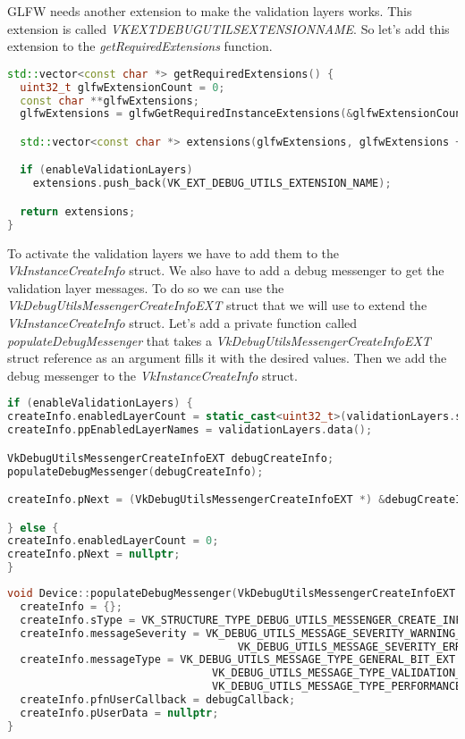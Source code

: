 \documentclass[12pt]{report} \usepackage{preamble}
\begin{document}
GLFW needs another extension to make the validation layers works. This extension is called
\textit{VK\textunderscore EXT\textunderscore DEBUG\textunderscore UTILS\textunderscore EXTENSION\textunderscore NAME}.
So let's add this extension to the \textit{getRequiredExtensions} function.

\begin{lstlisting}[language=C++]
std::vector<const char *> getRequiredExtensions() {
  uint32_t glfwExtensionCount = 0;
  const char **glfwExtensions;
  glfwExtensions = glfwGetRequiredInstanceExtensions(&glfwExtensionCount);

  std::vector<const char *> extensions(glfwExtensions, glfwExtensions + glfwExtensionCount);

  if (enableValidationLayers)
    extensions.push_back(VK_EXT_DEBUG_UTILS_EXTENSION_NAME);

  return extensions;
}
\end{lstlisting}

To activate the validation layers we have to add them to the \textit{VkInstanceCreateInfo} struct.
We also have to add a debug messenger to get the validation layer messages. To do so we can
use the \textit{VkDebugUtilsMessengerCreateInfoEXT} struct that we will use to extend the
\textit{VkInstanceCreateInfo} struct. Let's add a private function called \textit{populateDebugMessenger}
that takes a \textit{VkDebugUtilsMessengerCreateInfoEXT} struct reference as an argument fills it with
the desired values. Then we add the debug messenger to the \textit{VkInstanceCreateInfo} struct.

\begin{lstlisting}[language=C++]
if (enableValidationLayers) {
createInfo.enabledLayerCount = static_cast<uint32_t>(validationLayers.size());
createInfo.ppEnabledLayerNames = validationLayers.data();

VkDebugUtilsMessengerCreateInfoEXT debugCreateInfo;
populateDebugMessenger(debugCreateInfo);

createInfo.pNext = (VkDebugUtilsMessengerCreateInfoEXT *) &debugCreateInfo;

} else {
createInfo.enabledLayerCount = 0;
createInfo.pNext = nullptr;
}
\end{lstlisting}

\begin{lstlisting}[language=C++]
void Device::populateDebugMessenger(VkDebugUtilsMessengerCreateInfoEXT &createInfo) {
  createInfo = {};
  createInfo.sType = VK_STRUCTURE_TYPE_DEBUG_UTILS_MESSENGER_CREATE_INFO_EXT;
  createInfo.messageSeverity = VK_DEBUG_UTILS_MESSAGE_SEVERITY_WARNING_BIT_EXT |
                                    VK_DEBUG_UTILS_MESSAGE_SEVERITY_ERROR_BIT_EXT;
  createInfo.messageType = VK_DEBUG_UTILS_MESSAGE_TYPE_GENERAL_BIT_EXT | 
                                VK_DEBUG_UTILS_MESSAGE_TYPE_VALIDATION_BIT_EXT |
                                VK_DEBUG_UTILS_MESSAGE_TYPE_PERFORMANCE_BIT_EXT;
  createInfo.pfnUserCallback = debugCallback;
  createInfo.pUserData = nullptr;
}
\end{lstlisting}
\end{document}
